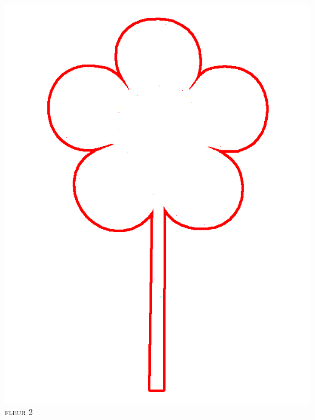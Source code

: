 \documentclass[french]{article}
\begin{document}
\begin{center}
    \begin{minipage}{.3\textwidth}
      \begin{center}
	\includegraphics[scale=0.19]{pictures/flower4.png}\\
	\textsc{fleur 2}
      \end{center}
    \end{minipage}
    \begin{minipage}{.3\textwidth}
      \begin{center}

\end{center}
\end{minipage}
\end{center}
\end{document}
